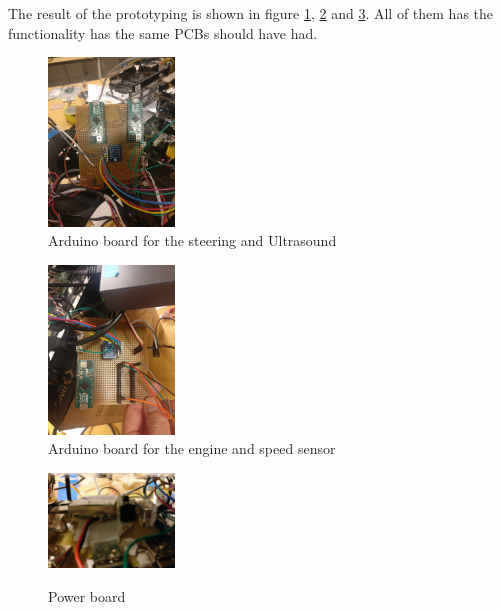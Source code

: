 \documentclass[11pt, titlepage]{article} %
\begin{document}
The result of the prototyping is shown in figure \ref{fig:board_ultra_steering}, \ref{fig:board_speed_engine} and \ref{fig:Power_board}. All of them has the functionality has the same PCBs should have had. 


\begin{figure}
	\includegraphics[width=0.3\textwidth]{arduino1.jpg}
	\caption{Arduino board for the steering and Ultrasound}
	\label{fig:board_ultra_steering}
\end{figure}

\begin{figure}
	\includegraphics[width=0.3\textwidth]{arduino2.jpg}
	\caption{Arduino board for the engine and speed sensor}
	\label{fig:board_speed_engine}
\end{figure}

\begin{figure}
	\includegraphics[width=0.3\textwidth]{power_board.jpg}
	\label{fig:Power_board}
	\caption{Power board}
\end{figure}



\end{document}
